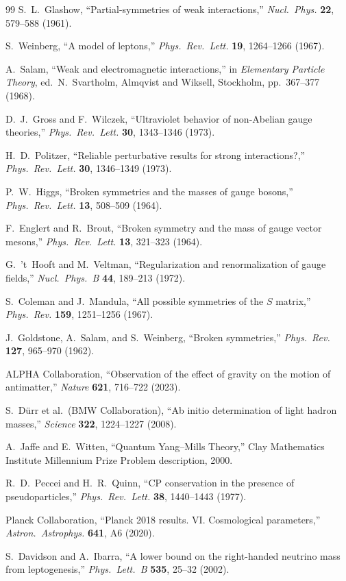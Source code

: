 \documentclass[12pt]{article}
\theoremstyle{definition}
\theoremstyle{remark}
\begin{document}
\begin{thebibliography}{99}
S.~L.~Glashow, ``Partial-symmetries of weak interactions,'' \textit{Nucl.\ Phys.} \textbf{22}, 579--588 (1961).

S.~Weinberg, ``A model of leptons,'' \textit{Phys.\ Rev.\ Lett.} \textbf{19}, 1264--1266 (1967).

A.~Salam, ``Weak and electromagnetic interactions,'' in \textit{Elementary Particle Theory}, ed.\ N.~Svartholm, Almqvist and Wiksell, Stockholm, pp.~367--377 (1968).

D.~J.~Gross and F.~Wilczek, ``Ultraviolet behavior of non-Abelian gauge theories,'' \textit{Phys.\ Rev.\ Lett.} \textbf{30}, 1343--1346 (1973).

H.~D.~Politzer, ``Reliable perturbative results for strong interactions?,'' \textit{Phys.\ Rev.\ Lett.} \textbf{30}, 1346--1349 (1973).

P.~W.~Higgs, ``Broken symmetries and the masses of gauge bosons,'' \textit{Phys.\ Rev.\ Lett.} \textbf{13}, 508--509 (1964).

F.~Englert and R.~Brout, ``Broken symmetry and the mass of gauge vector mesons,'' \textit{Phys.\ Rev.\ Lett.} \textbf{13}, 321--323 (1964).

G.~'t~Hooft and M.~Veltman, ``Regularization and renormalization of gauge fields,'' \textit{Nucl.\ Phys.\ B} \textbf{44}, 189--213 (1972).

S.~Coleman and J.~Mandula, ``All possible symmetries of the $S$ matrix,'' \textit{Phys.\ Rev.} \textbf{159}, 1251--1256 (1967).

J.~Goldstone, A.~Salam, and S.~Weinberg, ``Broken symmetries,'' \textit{Phys.\ Rev.} \textbf{127}, 965--970 (1962).

ALPHA Collaboration, ``Observation of the effect of gravity on the motion of antimatter,'' \textit{Nature} \textbf{621}, 716--722 (2023).

S.~D\"urr et al.\ (BMW Collaboration), ``Ab initio determination of light hadron masses,'' \textit{Science} \textbf{322}, 1224--1227 (2008).

A.~Jaffe and E.~Witten, ``Quantum Yang--Mills Theory,'' Clay Mathematics Institute Millennium Prize Problem description, 2000.

R.~D.~Peccei and H.~R.~Quinn, ``CP conservation in the presence of pseudoparticles,'' \textit{Phys.\ Rev.\ Lett.} \textbf{38}, 1440--1443 (1977).

Planck Collaboration, ``Planck 2018 results. VI. Cosmological parameters,'' \textit{Astron.\ Astrophys.} \textbf{641}, A6 (2020).

S.~Davidson and A.~Ibarra, ``A lower bound on the right-handed neutrino mass from leptogenesis,'' \textit{Phys.\ Lett.\ B} \textbf{535}, 25--32 (2002).

\end{thebibliography}
\end{document}
